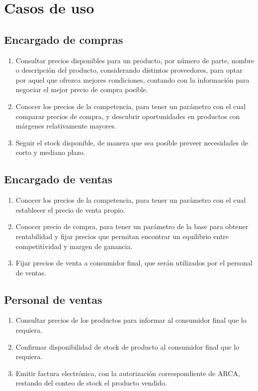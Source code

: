 \section{Casos de uso}

\subsection*{Encargado de compras}
\begin{enumerate}
	\item Consultar precios disponibles para un producto,  
	por número de parte, nombre o descripción del producto,
	considerando distintos proveedores,
	para optar por aquel que ofrezca mejores condiciones,
	contando con la información para negociar el mejor precio de compra posible.
	\item Conocer los precios de la competencia,
	para tener un parámetro con el cual comparar precios de compra,
	y descubrir oportunidades en productos con márgenes relativamente mayores.
	\item Seguir el stock disponible,
	de manera que sea posible preveer necesidades de corto y mediano plazo.
\end{enumerate}

\subsection*{Encargado de ventas}
\begin{enumerate}
	\item Conocer los precios de la competencia,
	para tener un parámetro con el cual establecer el precio de venta propio.
	\item Conocer precio de compra,
	para tener un parámetro de la base para obtener rentabilidad
	y fijar precios que permitan encontrar un equilibrio entre competitividad y margen de ganancia.
	\item Fijar precios de venta a consumidor final,
	que serán utilizados por el personal de ventas.
\end{enumerate}

\subsection*{Personal de ventas}
\begin{enumerate}
	\item Consultar precios de los productos para informar al consumidor final que lo requiera.
	\item Confirmar disponibilidad de stock de producto al consumidor final que lo requiera.
	\item Emitir factura electrónica,
	con la autorización correspondiente de ARCA,
	restando del conteo de stock el producto vendido.
\end{enumerate}

